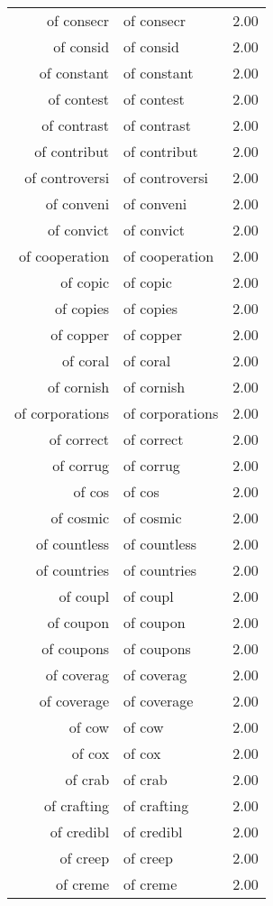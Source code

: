 \begin{table}[ht]
\begin{tabular}{rlr}
  of consecr & of consecr & 2.00 \\ 
  of consid & of consid & 2.00 \\ 
  of constant & of constant & 2.00 \\ 
  of contest & of contest & 2.00 \\ 
  of contrast & of contrast & 2.00 \\ 
  of contribut & of contribut & 2.00 \\ 
  of controversi & of controversi & 2.00 \\ 
  of conveni & of conveni & 2.00 \\ 
  of convict & of convict & 2.00 \\ 
  of cooperation & of cooperation & 2.00 \\ 
  of copic & of copic & 2.00 \\ 
  of copies & of copies & 2.00 \\ 
  of copper & of copper & 2.00 \\ 
  of coral & of coral & 2.00 \\ 
  of cornish & of cornish & 2.00 \\ 
  of corporations & of corporations & 2.00 \\ 
  of correct & of correct & 2.00 \\ 
  of corrug & of corrug & 2.00 \\ 
  of cos & of cos & 2.00 \\ 
  of cosmic & of cosmic & 2.00 \\ 
  of countless & of countless & 2.00 \\ 
  of countries & of countries & 2.00 \\ 
  of coupl & of coupl & 2.00 \\ 
  of coupon & of coupon & 2.00 \\ 
  of coupons & of coupons & 2.00 \\ 
  of coverag & of coverag & 2.00 \\ 
  of coverage & of coverage & 2.00 \\ 
  of cow & of cow & 2.00 \\ 
  of cox & of cox & 2.00 \\ 
  of crab & of crab & 2.00 \\ 
  of crafting & of crafting & 2.00 \\ 
  of credibl & of credibl & 2.00 \\ 
  of creep & of creep & 2.00 \\ 
  of creme & of creme & 2.00 \\ 

\end{tabular}
\end{table}

